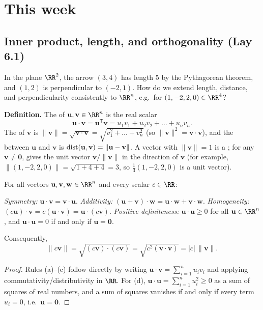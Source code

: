 \documentclass[10pt]{scrartcl}
\newcommand{\vv}[1]{\mathbf{#1}}
\begin{document}
\section{This week}

\subsection{Inner product, length, and orthogonality (Lay 6.1)}

\begin{qbox}
  In the plane $\RR^2$, the arrow $(3,4)$ has length $5$ by the Pythagorean theorem, and $(1,2)$ is perpendicular to $(-2,1)$. How do we extend length, distance, and perpendicularity consistently to $\RR^n$, e.g.\ for $(1,-2,2,0)\in\RR^4$?
\end{qbox}

\noindent\textbf{Definition.} The  of $\vv u,\vv v\in\RR^n$ is the real scalar
\[
  \vv u\cdot\vv v = \vv u^{\mathsf T}\vv v = u_1v_1 + u_2v_2 + \dots + u_nv_n.
\]
The  of $\vv v$ is $\|\vv v\|=\sqrt{\vv v\cdot\vv v}=\sqrt{v_1^2+\dots+v_n^2}$ (so $\|\vv v\|^2=\vv v\cdot\vv v$), and the  between $\vv u$ and $\vv v$ is $\dist(\vv u,\vv v)=\|\vv u-\vv v\|$. A vector with $\|\vv v\|=1$ is a ; for any $\vv v\neq\vv 0$,  gives the unit vector $\vv v/\|\vv v\|$ in the direction of $\vv v$ (for example, $\|(1,-2,2,0)\|=\sqrt{1+4+4}=3$, so $\frac13(1,-2,2,0)$ is a unit vector).

\begin{theorem*}
  For all vectors $\vv u,\vv v,\vv w\in\RR^n$ and every scalar $c\in\RR$:
  \begin{enumerate}
    \ii[(a)] \emph{Symmetry:} $\vv u\cdot\vv v = \vv v\cdot\vv u$.
    \ii[(b)] \emph{Additivity:} $(\vv u+\vv v)\cdot\vv w = \vv u\cdot\vv w + \vv v\cdot\vv w$.
    \ii[(c)] \emph{Homogeneity:} $(c\vv u)\cdot\vv v = c(\vv u\cdot\vv v) = \vv u\cdot(c\vv v)$.
    \ii[(d)] \emph{Positive definiteness:} $\vv u\cdot\vv u \ge 0$ for all $\vv u\in\RR^n$, and $\vv u\cdot\vv u = 0$ if and only if $\vv u=\vv 0$.
  \end{enumerate}
  Consequently,
  \[
    \|c\vv v\| = \sqrt{(c\vv v)\cdot(c\vv v)} = \sqrt{c^2(\vv v\cdot\vv v)} = |c|\,\|\vv v\|.
  \]
\end{theorem*}
\begin{proof}
  Rules (a)--(c) follow directly by writing $\vv u\cdot\vv v=\sum_{i=1}^n u_iv_i$ and applying commutativity/distributivity in $\RR$. For (d), $\vv u\cdot\vv u=\sum_{i=1}^n u_i^2\ge 0$ as a sum of squares of real numbers, and a sum of squares vanishes if and only if every term $u_i=0$, i.e.\ $\vv u=\vv 0$.
\end{proof}
\end{document}

